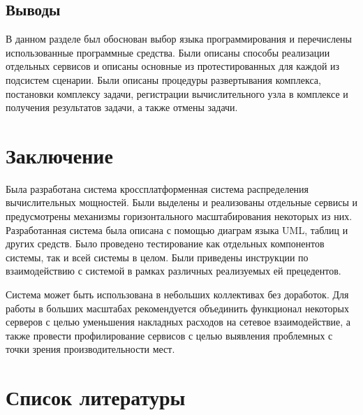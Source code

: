 \documentclass[a4paper,12pt]{report}
\numberwithin{equation}{section}
\begin{document}
  \subsection{Выводы}
  В данном разделе был обоснован выбор языка программирования и перечислены использованные программные средства.
  Были описаны способы реализации отдельных сервисов и описаны основные из протестированных для каждой из подсистем сценарии.
  Были описаны процедуры развертывания комплекса, постановки комплексу задачи, регистрации вычислительного узла в комплексе и получения результатов задачи, а также отмены задачи.
  
  \clearpage
  \section{Заключение}
  Была разработана система кроссплатформенная система распределения вычислительных мощностей. 
  Были выделены и реализованы отдельные сервисы и предусмотрены механизмы горизонтального масштабирования некоторых из них. 
  Разработанная система была описана с помощью диаграм языка UML, таблиц и других средств.
  Было проведено тестирование как отдельных компонентов системы, так и всей системы в целом.
  Были приведены инструкции по взаимодействию с системой в рамках различных реализуемых ей прецедентов.
  
  Система может быть использована в небольших коллективах без доработок.
  Для работы в больших масштабах рекомендуется объединить функционал некоторых серверов с целью уменьшения накладных расходов на сетевое взаимодействие, а также провести профилирование сервисов с целью выявления проблемных с точки зрения производительности мест.
  
  \clearpage
  \section*{Список литературы}
  \printbibliography[heading=none]  
  
\end{document}
